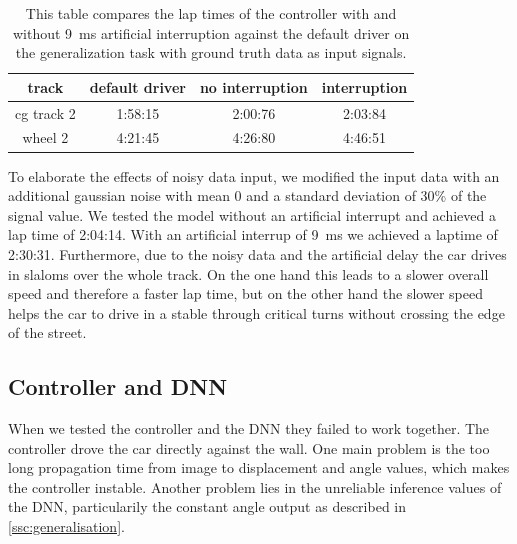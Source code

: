 \documentclass[10pt,a4paper,twoside,journal]{IEEEtran}
\begin{document}
\begin{table}[ht]
	\begin{center}
		\begin{tabular}{ |c|c|c|c| } 
			\hline
			track &  default driver & no interruption & interruption \\
			\hline
			cg track 2  & 1:58:15 & 2:00:76 & 2:03:84  \\
			wheel 2 & 4:21:45 & 4:26:80 & 4:46:51 \\
			\hline
		\end{tabular}
		\caption{\label{tab:controller_laptime}This table compares the lap times of the controller with and without \SI{9}{\milli\second} artificial interruption against the default driver on the generalization task with ground truth data as input signals.}
	\end{center}
\end{table}
To elaborate the effects of noisy data input, we modified the input data with an additional gaussian noise with mean 0 and a standard deviation of 30\% of the signal value. We tested the model without an artificial interrupt and achieved a lap time of 2:04:14. With an artificial interrup of \SI{9}{\milli\second} we achieved a laptime of 2:30:31. Furthermore, due to the noisy data and the artificial delay the car drives in slaloms over the whole track. On the one hand this leads to a slower overall speed and therefore a faster lap time, but on the other hand the slower speed helps the car to drive in a stable through critical turns without crossing the edge of the street.

\subsection{Controller and DNN}
When we tested the controller and the DNN they failed to work together. The controller drove the car directly against the wall. One main problem is the too long propagation time from image to displacement and angle values, which makes the controller instable. Another problem lies in the unreliable inference values of the DNN, particularily the constant angle output as described in \autoref{ssc:generalisation}.
\end{document}
